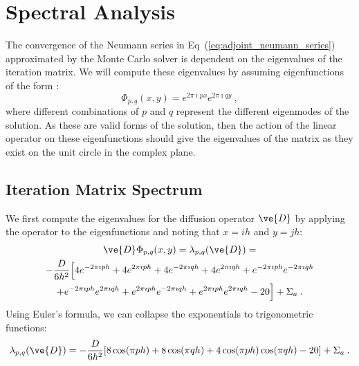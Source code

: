 \documentclass[preprint,11pt]{elsarticle}
\begin{document}
\section{Spectral Analysis}
\label{sec:spectral_analysis}

The convergence of the Neumann series in
Eq~(\ref{eq:adjoint_neumann_series}) approximated by the Monte Carlo
solver is dependent on the eigenvalues of the iteration matrix. We
will compute these eigenvalues by assuming eigenfunctions of the form
\cite{leveque_finite_2007}:
\begin{equation}
  \Phi_{p,q}(x,y) = e^{2 \pi \imath p x} e^{2 \pi \imath q y}\:,
  \label{eq:eigenfunction_form}
\end{equation}
where different combinations of $p$ and $q$ represent the different
eigenmodes of the solution. As these are valid forms of the solution,
then the action of the linear operator on these eigenfunctions should
give the eigenvalues of the matrix as they exist on the unit circle in
the complex plane.

\subsection{Iteration Matrix Spectrum}
\label{subsec:iteration_spectrum}

We first compute the eigenvalues for the diffusion operator $\ve{D}$ by
applying the operator to the eigenfunctions and noting that $x=ih$ and $y=jh$:
\begin{multline}
  \ve{D}\Phi_{p,q}(x,y) = \lambda_{p,q}(\ve{D})
  =\\ -\frac{D}{6h^2}\Big[4 e^{-2 \pi \imath p h} + 4 e^{2 \pi \imath
      p h} + 4 e^{-2 \pi \imath q h} + 4 e^{2 \pi \imath q h} + e^{-2
      \pi \imath p h} e^{-2 \pi \imath q h} \\ + e^{-2 \pi \imath p h}
    e^{2 \pi \imath q h} + e^{2 \pi \imath p h} e^{-2 \pi \imath q h}
    + e^{2 \pi \imath p h} e^{2 \pi \imath q h} - 20\Big] + \Sigma_a
  \:.
  \label{eq:deriv_diff_1}
\end{multline}
Using Euler's formula, we can collapse the exponentials to
trigonometric functions:
\begin{equation}
  \lambda_{p,q}(\ve{D}) = -\frac{D}{6h^2}[ 8 \cos(\pi p h) + 8
    \cos(\pi q h) + 4 \cos(\pi p h) \cos(\pi q h) - 20] + \Sigma_a\:.
  \label{eq:deriv_diff_2}
\end{equation}
\end{document}
